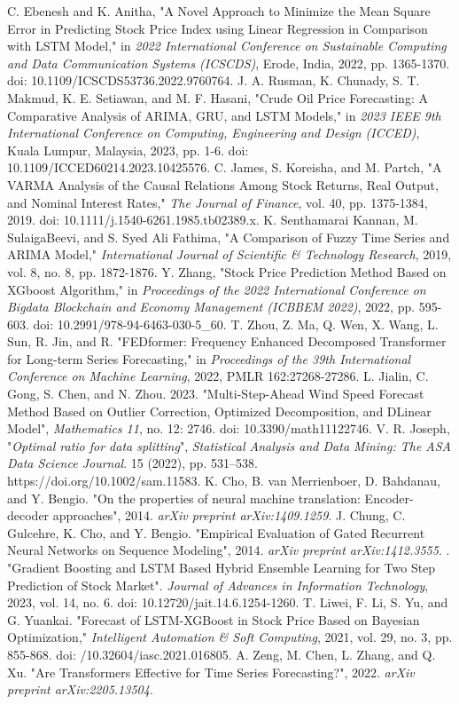 \documentclass[conference]{IEEEtran}
\begin{document}
\begin{thebibliography}{00}
 C. Ebenesh and K. Anitha, "A Novel Approach to Minimize the Mean Square Error in Predicting Stock Price Index using Linear Regression in Comparison with LSTM Model," in \textit{2022 International Conference on Sustainable Computing and Data Communication Systems (ICSCDS)}, Erode, India, 2022, pp. 1365-1370. doi: 10.1109/ICSCDS53736.2022.9760764.
 J. A. Rusman, K. Chunady, S. T. Makmud, K. E. Setiawan, and M. F. Hasani, "Crude Oil Price Forecasting: A Comparative Analysis of ARIMA, GRU, and LSTM Models," in \textit{2023 IEEE 9th International Conference on Computing, Engineering and Design (ICCED)}, Kuala Lumpur, Malaysia, 2023, pp. 1-6. doi: 10.1109/ICCED60214.2023.10425576.
 C. James, S. Koreisha, and M. Partch, "A VARMA Analysis of the Causal Relations Among Stock Returns, Real Output, and Nominal Interest Rates," \textit{The Journal of Finance}, vol. 40, pp. 1375-1384, 2019. doi: 10.1111/j.1540-6261.1985.tb02389.x.
 K. Senthamarai Kannan, M. SulaigaBeevi, and S. Syed Ali Fathima, "A Comparison of Fuzzy Time Series and ARIMA Model," \textit{International Journal of Scientific \& Technology Research}, 2019, vol. 8, no. 8, pp. 1872-1876.
 Y. Zhang, "Stock Price Prediction Method Based on XGboost Algorithm," in \textit{Proceedings of the 2022 International Conference on Bigdata Blockchain and Economy Management (ICBBEM 2022)}, 2022, pp. 595-603. doi: 10.2991/978-94-6463-030-5\_60.
 T. Zhou, Z. Ma, Q. Wen, X. Wang, L. Sun, R. Jin, and R. "FEDformer: Frequency Enhanced Decomposed Transformer for Long-term Series Forecasting," in \textit{Proceedings of the 39th International Conference on Machine Learning}, 2022, PMLR 162:27268-27286.
L. Jialin, C. Gong, S. Chen, and N. Zhou. 2023. "Multi-Step-Ahead Wind Speed Forecast Method Based on Outlier Correction, Optimized Decomposition, and DLinear Model", \textit{Mathematics 11}, no. 12: 2746. doi: 10.3390/math11122746.
V. R. Joseph, "\textit{Optimal ratio for data splitting}", \textit{Statistical Analysis and Data Mining: The ASA Data Science Journal}. 15 (2022), pp. 531–538. https://doi.org/10.1002/sam.11583.
K. Cho, B. van Merrienboer, D. Bahdanau, and Y. Bengio. "On the properties of neural machine translation: Encoder-decoder approaches", 2014. \textit{arXiv preprint arXiv:1409.1259}.
J. Chung, C. Gulcehre, K. Cho, and Y. Bengio. "Empirical Evaluation of Gated Recurrent Neural Networks on Sequence Modeling", 2014. \textit{arXiv preprint arXiv:1412.3555}.
. "Gradient Boosting and LSTM Based Hybrid Ensemble Learning for Two Step Prediction of Stock Market". \textit{Journal of Advances in Information Technology}, 2023, vol. 14, no. 6. doi: 10.12720/jait.14.6.1254-1260.
 T. Liwei, F. Li, S. Yu, and G. Yuankai. "Forecast of LSTM-XGBoost in Stock Price Based on Bayesian Optimization," \textit{Intelligent Automation \& Soft Computing}, 2021, vol. 29, no. 3, pp. 855-868. doi: /10.32604/iasc.2021.016805.
A. Zeng, M. Chen, L. Zhang, and Q. Xu. "Are Transformers Effective for Time Series Forecasting?", 2022. \textit{arXiv preprint arXiv:2205.13504}.
\end{thebibliography}
\vspace{12pt}
\end{document}

